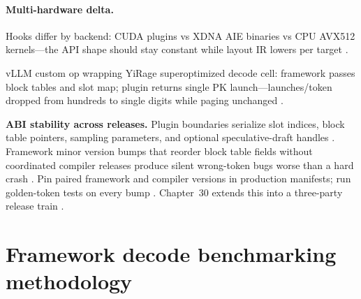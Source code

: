 \paragraph{Multi-hardware delta.} Hooks differ by backend: CUDA plugins vs XDNA AIE binaries vs CPU AVX512 kernels---the API shape should stay constant while layout IR lowers per target \citep{amd2024xdna,amd2024aie,chen2020compilerbasedhardw,yirage2026,patel2025llminference,kwon2023vllm,taxbreak2026,memoryfloor2026,dlbook,semianalysis2024tma,nvidia2022hopper,nvidia2024cudagraphs,dao2022flashattention,dao2023flashdecoding,liu2024deepseekv3}.

\begin{example}
vLLM custom op wrapping YiRage superoptimized decode cell: framework passes block tables and slot map; plugin returns single PK launch---launches/token dropped from hundreds to single digits while paging unchanged \citep{kwon2023vllm,yirage2026,chen2020compilerbasedhardw,taxbreak2026,patel2025llminference,memoryfloor2026,nvidia2024cudagraphs,dao2022flashattention,dlbook}.
\end{example}

\textbf{ABI stability across releases.} Plugin boundaries serialize slot indices, block table pointers, sampling parameters, and optional speculative-draft handles \citep{kwon2023vllm,patel2025llminference,yirage2026,chen2020compilerbasedhardw,nvidia2024cudagraphs,memoryfloor2026,taxbreak2026,dao2022flashattention,liu2024deepseekv3,semianalysis2024tma,dlbook,amd2024xdna,amd2024aie,dao2023flashdecoding,nvidia2022hopper,dlbook}. Framework minor version bumps that reorder block table fields without coordinated compiler releases produce silent wrong-token bugs worse than a hard crash \citep{kwon2023vllm,yirage2026,chen2020compilerbasedhardw,patel2025llminference,memoryfloor2026,taxbreak2026,dlbook}. Pin paired framework and compiler versions in production manifests; run golden-token tests on every bump \citep{patel2025llminference,yirage2026,chen2020compilerbasedhardw,kwon2023vllm,dao2022flashattention,memoryfloor2026,taxbreak2026,nvidia2024cudagraphs,liu2024deepseekv3,semianalysis2024tma,amd2024aie,amd2024xdna,dao2023flashdecoding,nvidia2022hopper,dlbook}. Chapter~30 extends this into a three-party release train \citep{yirage2026,chen2020compilerbasedhardw,patel2025llminference,dlbook,kwon2023vllm,taxbreak2026,memoryfloor2026,dlbook}.


\section{Framework decode benchmarking methodology}
\label{sec:ch28_framework_benchmark}

